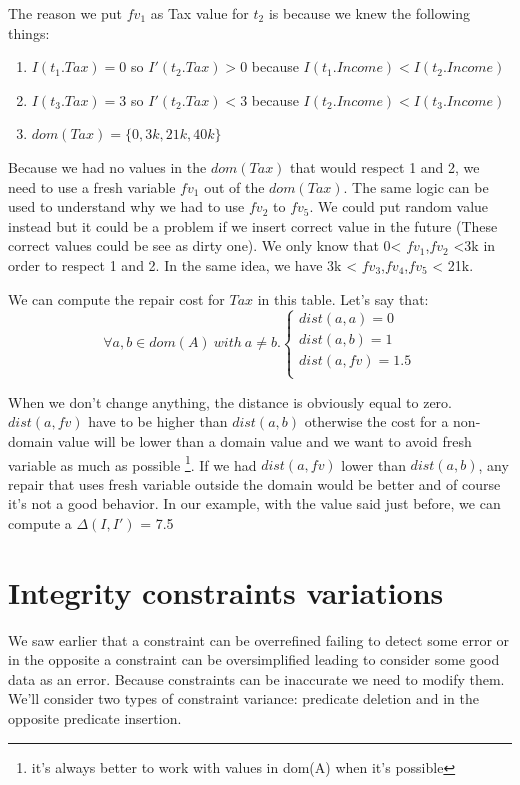 \documentclass[letterpaper, 12pt]{report}
\theoremstyle{definition}
\begin{document}
The reason we put $fv_1$ as Tax value for $t_2$ is because we knew the following things:
\begin{enumerate}

\item $I(t_1.Tax)=0$ so $I'(t_2.Tax)>0$ because $I(t_1.Income)<I(t_2.Income)$
\item $I(t_3.Tax)=3$ so $I'(t_2.Tax)<3$ because $I(t_2.Income)<I(t_3.Income)$
\item $dom(Tax) = \{0,3k,21k,40k\}$

\end{enumerate}
Because we had no values in the $dom(Tax)$ that would respect 1 and 2, we need to use a fresh variable $fv_1$ out of the $dom(Tax)$. The same  logic can be used to understand why we had to use $fv_2$ to $fv_5$. We could put random value instead but it could be a problem if we insert correct value in the future (These correct values could be see as dirty one).
We only know that 0< $fv_1$,$fv_2$ <3k in order to respect 1 and 2. In the same idea, we have 3k < $fv_3$,$fv_4$,$fv_5$ < 21k.

We can compute the repair cost for $Tax$ in this table. Let's say that:\\

$$
\forall a,b \in dom(A) \ with \ a \neq b.
\left\{
	\begin{array}{ll}
	   dist(a,a)=0\\
	   dist(a,b)=1\\
	   dist(a,fv)=1.5\\
	\end{array}
\right.
$$

When we don't change anything, the distance is obviously equal to zero. $dist(a,fv)$ have to be higher than $dist(a,b)$ otherwise the cost for a non-domain value will be lower than a domain value and we want to avoid fresh variable as much as possible \footnote{it's always better to work with values in dom(A) when it's possible}. If we had $dist(a,fv)$ lower than $dist(a,b)$, any repair that uses fresh variable outside the domain would be better and of course it's not a good behavior. In our example, with the value said just before, we can compute a $\Delta(I,I')$ = 7.5

\section{Integrity constraints variations}

We saw earlier that a constraint can be overrefined failing to detect some error or in the opposite a constraint can be oversimplified leading to consider some good data as an error. Because constraints can be inaccurate we need to modify them. We'll consider two types of constraint variance: predicate deletion and in the opposite predicate insertion.\\
\end{document}

